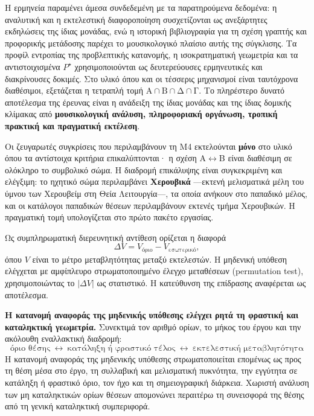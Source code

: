 \documentclass[11pt,a4paper]{article}
\begin{document}
Η ερμηνεία παραμένει άμεσα συνδεδεμένη με τα παρατηρούμενα δεδομένα: η αναλυτική και η εκτελεστική διαφοροποίηση συσχετίζονται ως ανεξάρτητες εκδηλώσεις της ίδιας μονάδας, ενώ η ιστορική βιβλιογραφία για τη σχέση γραπτής και προφορικής μετάδοσης παρέχει το μουσικολογικό πλαίσιο αυτής της σύγκλισης. Τα προφίλ εντροπίας της προβλεπτικής κατανομής, η ισοκρατηματική γεωμετρία και τα αντιστοιχισμένα $P^{\star}$ χρησιμοποιούνται ως δευτερεύουσες ερμηνευτικές και διακρίνουσες δοκιμές.
Στο υλικό όπου και οι τέσσερις μηχανισμοί είναι ταυτόχρονα διαθέσιμοι, εξετάζεται η τετραπλή τομή \(\text{Α}\cap\text{Β}\cap\text{Δ}\cap\text{Γ}\). Το πληρέστερο δυνατό αποτέλεσμα της έρευνας είναι η ανάδειξη της ίδιας μονάδας και της ίδιας δομικής κλίμακας από \textbf{μουσικολογική ανάλυση, πληροφοριακή οργάνωση, τροπική πρακτική και πραγματική εκτέλεση}.

Οι ζευγαρωτές συγκρίσεις που περιλαμβάνουν τη M4 εκτελούνται \textbf{μόνο} στο υλικό όπου τα αντίστοιχα κριτήρια επικαλύπτονται· η σχέση Α\(\leftrightarrow\)Β είναι διαθέσιμη σε ολόκληρο το συμβολικό σώμα. Η διαδρομή επικάλυψης είναι συγκεκριμένη και ελέγξιμη: το ηχητικό σώμα περιλαμβάνει \textbf{Χερουβικά} ---εκτενή μελισματικά μέλη του ύμνου των Χερουβείμ στη Θεία Λειτουργία---, τα οποία ανήκουν στο παπαδικό μέλος, και οι κατάλογοι παπαδικών θέσεων περιλαμβάνουν εκτενές τμήμα Χερουβικών. Η πραγματική τομή υπολογίζεται στο πρώτο πακέτο εργασίας.

Ως συμπληρωματική διερευνητική αντίθεση ορίζεται η διαφορά
\[
\Delta V=V_{\text{όριο}}-V_{\text{εσωτερικό}},
\]
όπου \(V\) είναι το μέτρο μεταβλητότητας μεταξύ εκτελεστών. Η μηδενική υπόθεση ελέγχεται με αμφίπλευρο στρωματοποιημένο έλεγχο μεταθέσεων (permutation test), χρησιμοποιώντας το \(|\Delta V|\) ως στατιστικό. Η κατεύθυνση της επίδρασης αναφέρεται ως αποτέλεσμα.

\textbf{Η κατανομή αναφοράς της μηδενικής υπόθεσης ελέγχει ρητά τη φραστική και καταληκτική γεωμετρία.} Συνεκτιμά τον αριθμό ορίων, το μήκος του έργου και την ακόλουθη εναλλακτική διαδρομή:
\[
\text{όριο θέσης}\ \leftrightarrow\ \text{κατάληξη ή φραστικό τέλος}\ \leftrightarrow\ \text{εκτελεστική μεταβλητότητα}
\]
Η κατανομή αναφοράς της μηδενικής υπόθεσης στρωματοποιείται επομένως ως προς τη θέση μέσα στο έργο, τη συλλαβική και μελισματική πυκνότητα, την εγγύτητα σε κατάληξη ή φραστικό όριο, τον ήχο και τη σημειογραφική διάρκεια. Χωριστή ανάλυση των μη καταληκτικών ορίων θέσεων απομονώνει περαιτέρω τη συνεισφορά της θέσης από τη γενική καταληκτική συμπεριφορά.
\end{document}
